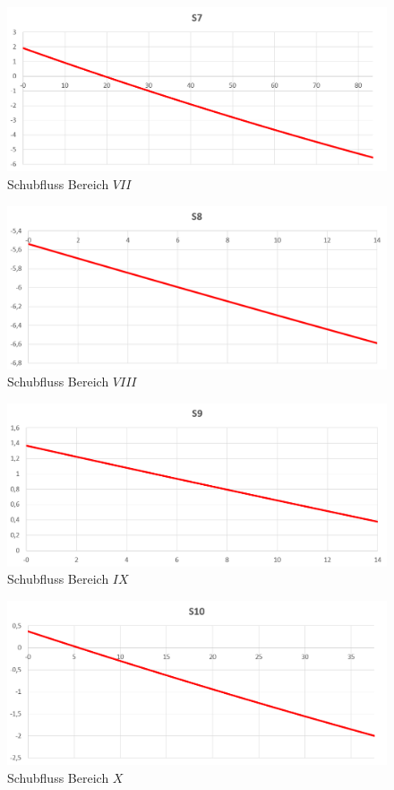 \begin{figure}
	\includegraphics[width=1.0\textwidth]{Bilder/S7.png}
	\caption{Schubfluss Bereich $VII$}
	\label{fig:S7}
\end{figure}
\begin{figure}
	\includegraphics[width=1.0\textwidth]{Bilder/S8.png}
	\caption{Schubfluss Bereich $VIII$}
	\label{fig:S8}
\end{figure}
\begin{figure}
	\includegraphics[width=1.0\textwidth]{Bilder/S9.png}
	\caption{Schubfluss Bereich $IX$}
	\label{fig:S9}
\end{figure}
\begin{figure}
	\includegraphics[width=1.0\textwidth]{Bilder/S10.png}
	\caption{Schubfluss Bereich $X$}
	\label{fig:S10}
\end{figure}
